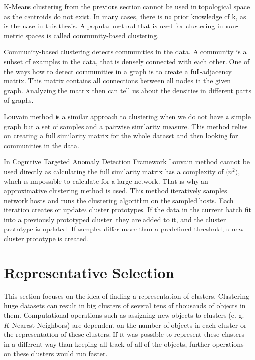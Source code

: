 \documentclass[thesis=B,english]{FITthesis}[2012/10/20]
\begin{document}
K-Means clustering from the previous section cannot be used in topological space as the centroids do not exist.
In many cases, there is no prior knowledge of k, as is the case in this thesis.
A popular method that is used for clustering in non-metric spaces is called community-based clustering.

Community-based clustering detects communities in the data.
A community is a subset of examples in the data, that is densely connected with each other.
One of the ways how to detect communities in a graph is to create a full-adjacency matrix.
This matrix contains all connections between all nodes in the given graph.
Analyzing the matrix then can tell us about the densities in different parts of graphs.

Louvain method is a similar approach to clustering when we do not have a simple graph but a set of samples and a pairwise similarity measure.
This method relies on creating a full similarity matrix for the whole dataset and then looking for communities in the data.

In Cognitive Targeted Anomaly Detection Framework Louvain method cannot be used directly as calculating the full similarity matrix has a complexity of $\mathcal(n^2)$, which is impossible to calculate for a large network.
That is why an approximative clustering method is used.
This method iteratively samples network hosts and runs the clustering algorithm on the sampled hosts.
Each iteration creates or updates cluster prototypes.
If the data in the current batch fit into a previously prototyped cluster, they are added to it, and the cluster prototype is updated.
If samples differ more than a predefined threshold, a new cluster prototype is created.

\section{Representative Selection}

This section focuses on the idea of finding a representation of clusters.
Clustering huge datasets can result in big clusters of several tens of thousands of objects in them.
Computational operations such as assigning new objects to clusters (e. g. $K$-Nearest Neighbors) are dependent on the number of objects in each cluster or the representation of these clusters.
If it was possible to represent these clusters in a different way than keeping all track of all of the objects, further operations on these clusters would run faster.
\end{document}
